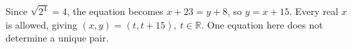 Since $\sqrt{2^4}=4$, the equation becomes $x+23=y+8$, so $y=x+15$. Every real $x$ is allowed, giving $\boxed{(x,y)=(t,t+15),\ t\in\mathbb R}$. One equation here does not determine a unique pair.
